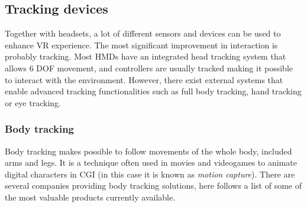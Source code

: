 \documentclass[binding=0.6cm,LaM]{sapthesis}
\begin{document}
\subsection{Tracking devices}	
Together with headsets, a lot of different sensors and devices can be used to enhance VR experience. The most significant improvement in interaction is probably tracking. Most HMDs have an integrated head tracking system that allows 6 DOF movement, and controllers are usually tracked making it possible to interact with the environment. However, there exist external systems that enable advanced tracking functionalities such as full body tracking, hand tracking or eye tracking.

\subsubsection{Body tracking}
Body tracking makes possible to follow movements of the whole body, included arms and legs. It is a technique often used in movies and videogames to animate digital characters in CGI (in this case it is known as \textit{motion capture}). There are several companies providing body tracking solutions, here follows a list of some of the most valuable products currently available.
\end{document}
